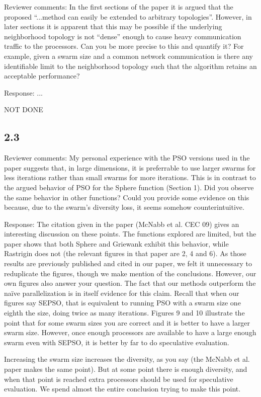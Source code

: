 \documentclass[onecolumn, 12pt]{article}
\begin{document}
Reviewer comments: In the first sections of the paper it is argued that the
proposed ``...method can easily be extended to arbitrary topologies''. However,
in later sections it is apparent that this may be possible if the underlying
neighborhood topology is not ``dense'' enough to cause heavy communication
traffic to the processors.  Can you be more precise to this and quantify it?
For example, given a swarm size and a common network communication is there any
identifiable limit to the neighborhood topology such that the algorithm retains
an acceptable performance?

Response: ...

NOT DONE

\subsection*{2.3}

Reviewer comments: My personal experience with the PSO versions used in the
paper suggests that, in large dimensions, it is preferrable to use larger
swarms for less iterations rather than small swarms for more iterations. This
is in contrast to the argued behavior of PSO for the Sphere function (Section
1).  Did you observe the same behavior in other functions?  Could you provide
some evidence on this because, due to the swarm's diversity loss, it seems
somehow counterintuitive.

Response: The citation given in the paper (McNabb et al. CEC 09) gives an
interesting discussion on these points.  The functions explored are limited,
but the paper shows that both Sphere and Griewank exhibit this behavior, while
Rastrigin does not (the relevant figures in that paper are 2, 4 and 6).  As
those results are previously published and cited in our paper, we felt it
unnecessary to reduplicate the figures, though we make mention of the
conclusions.  However, our own figures also answer your question.  The fact
that our methods outperform the na\"ive parallelization is in itself evidence
for this claim.  Recall that when our figures say SEPSO, that is equivalent to
running PSO with a swarm size one eighth the size, doing twice as many
iterations.  Figures 9 and 10 illustrate the point that for some swarm sizes
you are correct and it is better to have a larger swarm size.  However, once
enough processors are available to have a large enough swarm even with SEPSO,
it is better by far to do speculative evaluation.

Increasing the swarm size increases the diversity, as you say (the McNabb et
al. paper makes the same point).  But at some point there is enough diversity,
and when that point is reached extra processors should be used for speculative
evaluation.  We spend almost the entire conclusion trying to make this point.
\end{document}

